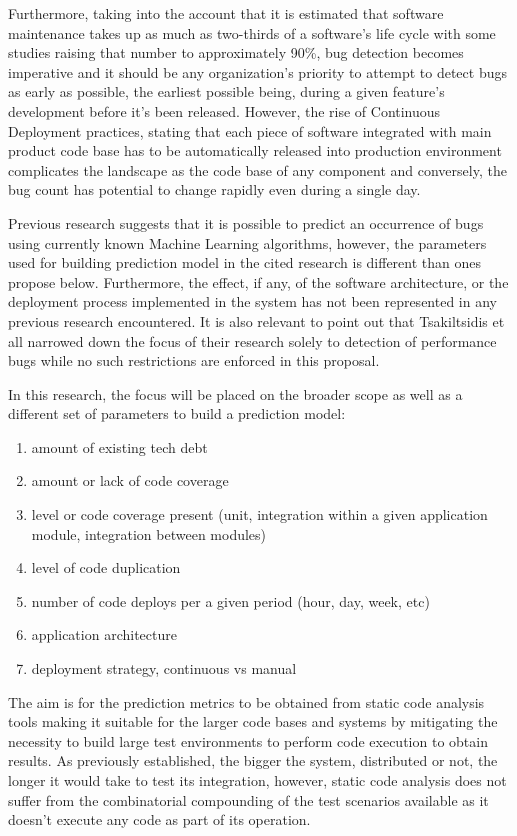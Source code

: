 Furthermore, taking into the account that it is estimated that software maintenance takes up as much as two-thirds of a software's life cycle\cite{duplicateBugDetection} with some studies raising that number to approximately 90\%\cite{reopenedBugsAndMaintenence}, bug detection becomes imperative and it should be any organization's priority to attempt to detect bugs as early as possible, the earliest possible being, during a given feature's development before it's been released. However, the rise of Continuous Deployment practices, stating that each piece of software integrated with main product code base has to be automatically released into production environment complicates the landscape as the code base of any component and conversely, the bug count has potential to change rapidly even during a single day.

Previous research suggests that it is possible to predict an occurrence of bugs using currently known Machine Learning algorithms\cite{autoDetectionOfPerfBugs}, however, the parameters used for building prediction model in the cited research is different than ones propose below. Furthermore, the effect, if any, of the software architecture, or the deployment process implemented in the system has not been represented in any previous research encountered. It is also relevant to point out that Tsakiltsidis et all\cite{autoDetectionOfPerfBugs} narrowed down the focus of their research solely to detection of performance bugs while no such restrictions are enforced in this proposal.

In this research, the focus will be placed on the broader scope as well as a different set of parameters to build a prediction model: 
\begin{enumerate}
\item amount of existing tech debt
\item amount or lack of code coverage
\item level or code coverage present (unit, integration within a given application module, integration between modules)
\item level of code duplication
\item number of code deploys per a given period (hour, day, week, etc)
\item application architecture
\item deployment strategy, continuous vs manual
\end{enumerate}
The aim is for the prediction metrics to be obtained from static code analysis tools making it suitable for the larger code bases and systems by mitigating the necessity to build large test environments to perform code execution to obtain results. As previously established, the bigger the system, distributed or not, the longer it would take to test its integration, however, static code analysis does not suffer from the combinatorial compounding of the test scenarios available as it doesn't execute any code as part of its operation.

